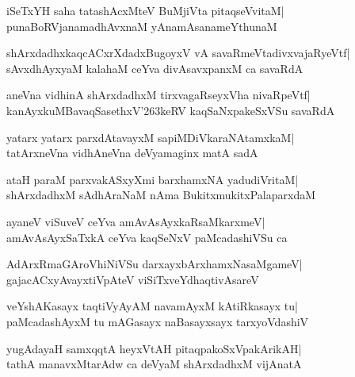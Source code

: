\documentclass[twoside,12pt,openright]{book}
\newcounter{shloka}[chapter]
\begin{document}
\begin{shloka}%
iSeTxYH saha tatashAcxMteV BuMjiVta pitaqseVvitaM|\\
punaBoRVjanamadhAvxnaM yAnamAsanameYthunaM
\end{shloka}

\begin{shloka}%
shArxdadhxkaqcACxrXdadxBugoyxV vA savaRmeVtadivxvajaRyeVtf|\\
sAvxdhAyxyaM kalahaM ceYva divAsavxpanxM ca savaRdA
\end{shloka}

\begin{shloka}%
aneVna vidhinA shArxdadhxM tirxvagaRseyxVha nivaRpeVtf|\\
kanAyxkuMBavaqSasethxV\char'263keRV kaqSaNxpakeSxVSu savaRdA
\end{shloka}

\begin{shloka}%
yatarx yatarx parxdAtavayxM sapiMDiVkaraNAtamxkaM|\\
tatArxneVna vidhAneVna deVyamaginx matA sadA
\end{shloka}

\begin{shloka}%
ataH paraM parxvakASxyXmi barxhamxNA yadudiVritaM|\\
shArxdadhxM sAdhAraNaM nAma BukitxmukitxPalaparxdaM
\end{shloka}

\begin{shloka}%
ayaneV viSuveV ceYva amAvAsAyxkaRsaMkarxmeV|\\
amAvAsAyxSaTxkA ceYva kaqSeNxV paMcadashiVSu ca 
\end{shloka}

\begin{shloka}%
AdArxRmaGAroVhiNiVSu darxayxbArxhamxNasaMgameV|\\
gajacACxyAvayxtiVpAteV viSiTxveYdhaqtivAsareV
\end{shloka}

\begin{shloka}%
veYshAKasayx taqtiVyAyAM navamAyxM kAtiRkasayx tu|\\
paMcadashAyxM tu mAGasayx naBasayxsayx tarxyoVdashiV
\end{shloka}

\begin{shloka}%
yugAdayaH samxqqtA heyxVtAH pitaqpakoSxVpakArikAH|\\
tathA manavxMtarAdw ca deVyaM shArxdadhxM vijAnatA
\end{shloka}
\end{document}
